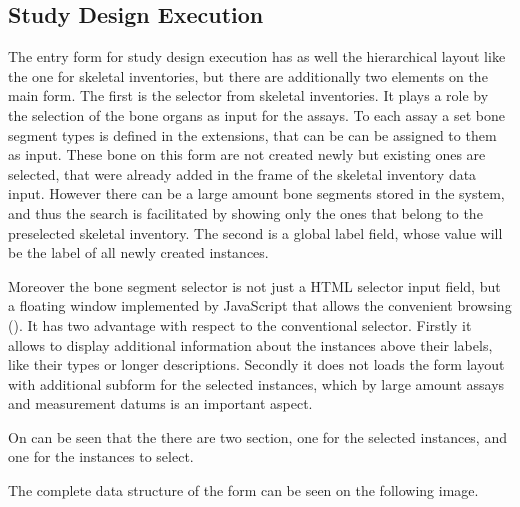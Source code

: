 \subsection{Study Design Execution} \label{43}


The entry form for study design execution has as well the hierarchical layout like the one for skeletal inventories, but there are additionally two elements on the main form. The first is the selector from skeletal inventories. It plays a role by the selection of the bone organs as input for the assays. To each assay a set bone segment types is defined in the extensions, that can be can be assigned to them as input. These bone on this form are not created newly but existing ones are selected, that were already added in the frame of the skeletal inventory data input.  However there can be a large amount bone segments stored in the system, and thus the search is facilitated by showing only the ones that belong to the preselected skeletal inventory. The second is a global label field, whose value will be the label of all newly created instances.





Moreover the bone segment selector is not just a HTML selector input field, but a floating window implemented by JavaScript that allows the convenient browsing (). It has two advantage with respect to the conventional selector. Firstly it allows to display additional information about the instances above their labels, like their types or longer descriptions. Secondly it does not loads the form layout with additional subform for the selected instances, which by large amount assays and measurement datums is an important aspect.



On  can be seen that the there are two section, one for the selected instances, and one for the instances to select. 


The complete data structure of the form can be seen on the following image.



